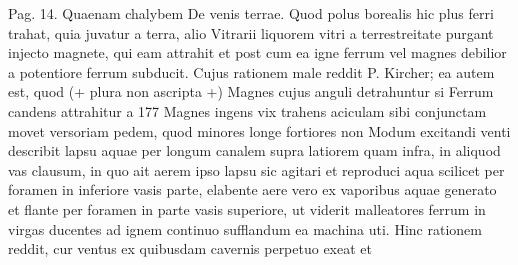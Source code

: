 Pag. 14. Quaenam chalybem\protect{} 
De venis terrae.  Quod polus borealis hic plus ferri\protect{} trahat, quia juvatur a terra, alio 
Vitrarii\protect{} liquorem vitri\protect{} a terrestreitate purgant injecto magnete, qui eam attrahit et post cum ea igne  ferrum vel magnes debilior a potentiore ferrum subducit.
Cujus rationem male reddit P. Kircher; ea autem est, quod 
(+ plura non ascripta +)
Magnes cujus anguli detrahuntur si 
\pend
\pstart
Ferrum candens attrahitur a 
177 Magnes ingens vix trahens aciculam\protect{} sibi conjunctam movet versoriam\protect{}   pedem, quod minores longe fortiores non 
\pend
{} Modum excitandi venti describit lapsu\protect{} aquae\protect{} per longum canalem\protect{} supra latiorem quam infra, in aliquod vas clausum, in quo ait aerem\protect{} ipso lapsu sic agitari et reproduci aqua scilicet per foramen in inferiore vasis parte, elabente aere vero ex vaporibus aquae generato et flante per foramen in parte vasis\protect{} superiore, ut viderit malleatores\protect{} ferrum\protect{} in virgas\protect{} ducentes ad ignem\protect{} continuo sufflandum ea machina\protect{} uti. Hinc rationem reddit, cur ventus ex quibusdam cavernis\protect{} perpetuo exeat et 
